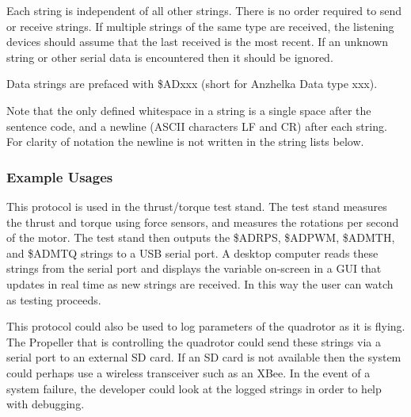 \documentclass{article}
\numberwithin{equation}{section} %
\begin{document}
Each string is independent of all other strings. There is no order required to send or receive strings. If multiple strings of the same type are received, the listening devices should assume that the last received is the most recent. If an unknown string or other serial data is encountered then it should be ignored.

Data strings are prefaced with \$ADxxx (short for Anzhelka Data type xxx). 

Note that the only defined whitespace in a string is a single space after the sentence code, and a newline (ASCII characters LF and CR) after each string. For clarity of notation the newline is not written in the string lists below.

\subsubsection{Example Usages}
This protocol is used in the thrust/torque test stand. The test stand measures the thrust and torque using force sensors, and measures the rotations per second of the motor. The test stand then outputs the \$ADRPS, \$ADPWM, \$ADMTH, and \$ADMTQ strings to a USB serial port. A desktop computer reads these strings from the serial port and displays the variable on-screen in a GUI that updates in real time as new strings are received. In this way the user can watch as testing proceeds.

This protocol could also be used to log parameters of the quadrotor as it is flying. The Propeller that is controlling the quadrotor could send these strings via a serial port to an external SD card. If an SD card is not available then the system could perhaps use a wireless transceiver such as an XBee. In the event of a system failure, the developer could look at the logged strings in order to help with debugging. 
\end{document}
